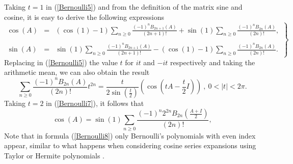 Taking $t=1$ in (\ref{Bernoulli5}) and from the definition of the matrix sine and cosine, it is easy to derive the following expressions
\begin{equation}\label{Bernoulli6}
\left.\begin{array}{rcl}
\cos{(A)} &=&\displaystyle  \left( \cos{(1)}-1\right)\sum_{n \geq 0} \frac{(-1)^n B_{2n+1}(A)}{(2n+1)!}+ \sin{(1)}\sum_{n \geq 0} \frac{(-1)^n B_{2n}(A)}{(2n)!}, \\
\\
\sin{(A)} &=& \displaystyle   \sin{(1)}\sum_{n \geq 0} \frac{ (-1)^n B_{2n+1}(A)}{(2n+1)!}-\left(\cos{(1)}-1\right)\sum_{n \geq 0} \frac{ (-1)^n B_{2n}(A)}{(2n)!}.
\end{array} \right\}
\end{equation}
Replacing in (\ref{Bernoulli5}) the value $t$ for $it$ and $-it$ respectively and taking the arithmetic mean, we can also obtain the result
\begin{equation}\label{Bernoulli7}
\sum_{n \geq 0} \frac{(-1)^n B_{2n}(A)}{(2n)!}t^{2n} =\frac{t}{2 \sin{\left( \frac{t}{2} \right)}}\left(\cos{\left(t A- \frac{t}{2}I \right)}  \right)  \ , \ 0<|t|<2\pi.
\end{equation}
Taking $t=2$ in (\ref{Bernoulli7}), it follows that
\begin{equation}\label{Bernoulli8}
\cos{(A)} = \sin{(1)}\sum_{n \geq 0} \frac{(-1)^n 2^{2n} B_{2n}\left(\frac{A+I}{2}\right)}{(2n)!},
\end{equation}
Note that in formula (\ref{Bernoulli8}) only Bernoulli's polynomials with even index appear, similar to what happens when considering cosine
series expansions using Taylor or Hermite polynomials \cite{sastre2017two,defez2019efficient}.
